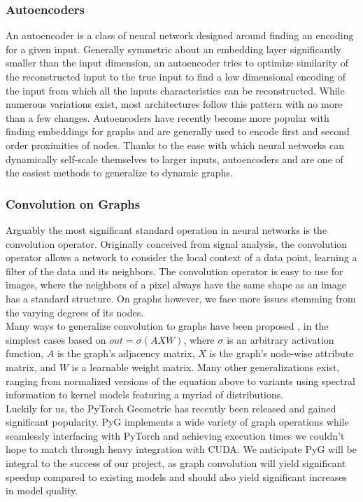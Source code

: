 \documentclass[10pt]{article}
\begin{document}
\subsubsection{Autoencoders}

An autoencoder is a class of neural network designed around finding an encoding for a given input. Generally symmetric about an embedding layer significantly smaller than the input dimension, an autoencoder tries to optimize similarity of the reconstructed input to the true input to find a low dimensional encoding of the input from which all the inputs characteristics can be reconstructed. While numerous variations exist, most architectures follow this pattern with no more than a few changes. Autoencoders have recently become more popular with finding embeddings for graphs and are generally used to encode first and second order proximities of nodes. Thanks to the ease with which neural networks can dynamically self-scale themselves to larger inputs, autoencoders and are one of the easiest methods to generalize to dynamic graphs. \\

\subsubsection{Convolution on Graphs}

Arguably the most significant standard operation in neural networks is the convolution operator. Originally conceived from signal analysis, the convolution operator allows a network to consider the local context of a data point, learning a filter of the data and its neighbors. The convolution operator is easy to use for images, where the neighbors of a pixel always have the same shape as an image has a standard structure. On graphs however, we face more issues stemming from the varying degrees of its nodes. \\

Many ways to generalize convolution to graphs have been proposed \cite{wu2019comprehensive}, in the simplest cases based on $out = \sigma (AXW)$, where $\sigma$ is an arbitrary activation function, $A$ is the graph's adjacency matrix, $X$ is the graph's node-wise attribute matrix, and $W$ is a learnable weight matrix. Many other generalizations exist, ranging from normalized versions of the equation above to variants using spectral information to kernel models featuring a myriad of distributions. \\

Luckily for us, the PyTorch Geometric \cite{Fey/Lenssen/2019} has recently been released and gained significant popularity. PyG implements a wide variety of graph operations while seamlessly interfacing with PyTorch and achieving execution times we couldn't hope to match through heavy integration with CUDA. We anticipate PyG will be integral to the success of our project, as graph convolution will yield significant speedup compared to existing models and should also yield significant increases in model quality. \\
\end{document}
